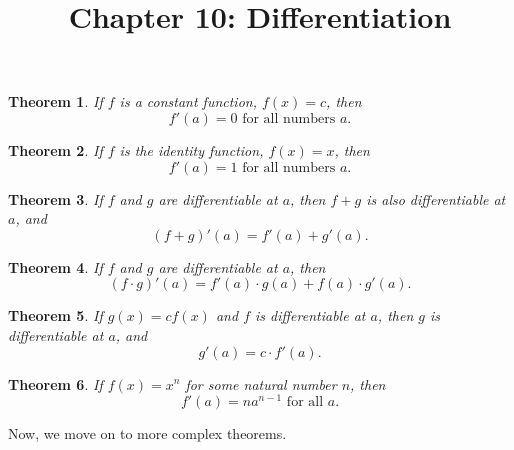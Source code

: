 \documentclass{article}
\newtheorem{theorem}{Theorem}
\begin{document}
\title{Chapter 10: Differentiation}
\maketitle

\begin{theorem}
  If $f$ is a constant function, $f(x) = c$, then \[
    f'(a) = 0 \text{ for all numbers } a.
  \]
\end{theorem}

\begin{theorem}
  If $f$ is the identity function, $f(x) = x$, then \begin{equation*}
    f'(a) = 1 \text{ for all numbers } a.
  \end{equation*}
\end{theorem}

\begin{theorem}
  If $f$ and $g$ are differentiable at $a$, then $f + g$ is also differentiable
  at $a$, and \begin{equation*}
    (f + g)'(a) = f'(a) + g'(a).
  \end{equation*}
\end{theorem}

\begin{theorem}
  If $f$ and $g$ are differentiable at $a$, then \begin{equation*}
    (f \cdot g)'(a) = f'(a) \cdot g(a) + f(a) \cdot g'(a).
  \end{equation*}
\end{theorem}

\begin{theorem}
  If $g(x) = cf(x)$ and $f$ is differentiable at $a$, then $g$ is
  differentiable at $a$, and \begin{equation*}
    g'(a) = c \cdot f'(a).
  \end{equation*}
\end{theorem}

\begin{theorem}
  If $f(x) = x^n$ for some natural number $n$, then \begin{equation*}
    f'(a) = na^{n-1} \text{ for all } a.
  \end{equation*}
\end{theorem}

Now, we move on to more complex theorems.
\end{document}
